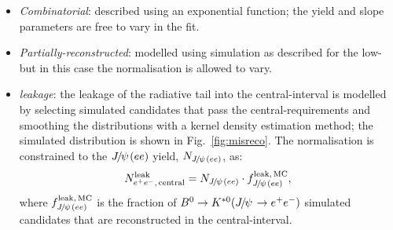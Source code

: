 \begin{itemize}

\item \textit{Combinatorial}: described using an exponential function;
the yield and slope parameters are free to vary in the fit.

\item \textit{Partially-reconstructed}: modelled using simulation as described for the low-\qsq 
but in this case the normalisation is allowed to vary.

%
%

\item \textit{\BdToKstJPs leakage}: the leakage of the \jpsi radiative tail into the central-\qsq interval is modelled by selecting 
simulated \BdToKstJPsee candidates that pass the central-\qsq requirements and smoothing the distributions
with a kernel density estimation method; the simulated distribution is shown in Fig.~\ref{fig:misreco}. The normalisation is constrained 
to the $\jpsi(ee)$ yield, $N_{\jpsi (ee)}$, as:
%
$$N_{\ee, \, {\rm central}}^{\rm leak} = N_{\jpsi(ee)} \cdot f_{\jpsi(ee)}^{\rm leak, \,MC},$$
%
where $f_{\jpsi(ee)}^{\rm leak, \,MC}$ is the fraction of $\Bd\to\Kstarz(\jpsi\to\ee)$ simulated candidates 
that are reconstructed in the central-\qsq interval.

\end{itemize}

